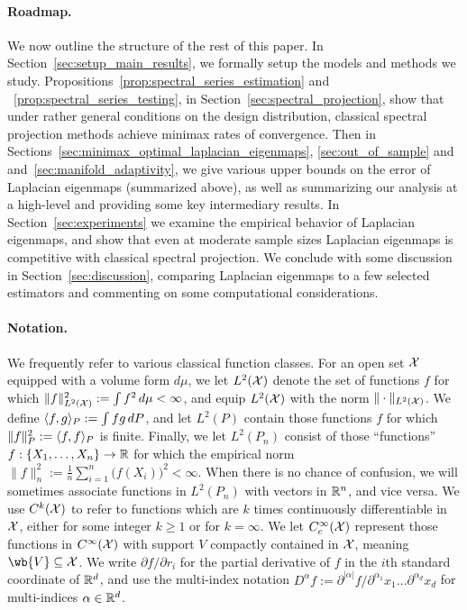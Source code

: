 \paragraph{Roadmap.}
We now outline the structure of the rest of this paper. In Section~\ref{sec:setup_main_results}, we formally setup the models and methods we study. Propositions~\ref{prop:spectral_series_estimation} and ~\ref{prop:spectral_series_testing}, in Section~\ref{sec:spectral_projection}, show that under rather general conditions on the design distribution, classical spectral projection methods achieve minimax rates of convergence. Then in Sections~\ref{sec:minimax_optimal_laplacian_eigenmaps}, \ref{sec:out_of_sample} and and~\ref{sec:manifold_adaptivity}, we give various upper bounds on the error of Laplacian eigenmaps (summarized above), as well as summarizing our analysis at a high-level and providing some key intermediary results. In Section~\ref{sec:experiments} we examine the empirical behavior of Laplacian eigenmaps, and show that even at moderate sample sizes Laplacian eigenmaps is competitive with classical spectral projection. We conclude with some discussion in Section~\ref{sec:discussion}, comparing Laplacian eigenmaps to a few selected estimators and commenting on some computational considerations.

\paragraph{Notation.}
We frequently refer to various classical function classes. For an open set $\mathcal{X}$ equipped with a volume form $d\mu$, we let $L^2(\mathcal{X})$ denote the set of functions $f$ for which $\|f\|_{L^2(\mathcal{X})}^2 := \int f^2 \,d\mu  < \infty$, and equip $L^2(\mathcal{X})$ with the norm $\|\cdot\|_{L^2(\mathcal{X})}$. We define $\langle f, g \rangle_P := \int fg\,dP$, and let $L^2(P)$ contain those functions $f$ for which $\|f\|_P^2 := \langle f, f \rangle_P$ is finite. Finally, we let $L^2(P_n)$ consist of those ``functions'' $f: \left\{X_1,\ldots,X_n\right\} \to \mathbb{R}$ for which the empirical norm $\|f\|_{n}^2 := \frac{1}{n}\sum_{i = 1}^{n} \bigl(f(X_i)\bigr)^2 < \infty$. When there is no chance of confusion, we will sometimes associate functions in $L^2(P_n)$ with vectors in $\mathbb{R}^n$, and vice versa. We use $C^k(\mathcal{X})$ to refer to functions which are $k$ times continuously differentiable in $\mathcal{X}$, either for some integer $k \geq 1$ or for $k = \infty$. We let $C_c^{\infty}(\mathcal{X})$ represent those functions in $C^{\infty}(\mathcal{X})$ with support $V$ compactly contained in $\mathcal{X}$, meaning $\wb{V} \subseteq \mc{X}$. We write $\partial f/\partial r_i$ for the partial derivative of $f$ in the $i$th standard coordinate of $\mathbb{R}^d$, and use the multi-index notation $D^{\alpha}f := \partial^{|\alpha|}f/\partial^{\alpha_1}x_1\ldots\partial^{\alpha_d}x_d$ for multi-indices $\alpha \in \mathbb{R}^d$.

